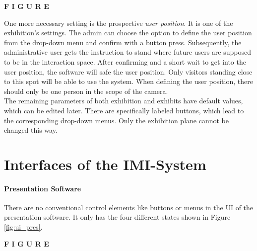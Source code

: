 \textbf{F I G U R E}

One more necessary setting is the prospective \textit{user position}. It is one of the exhibition's settings. The admin can choose the option to define the user position from the drop-down menu and confirm with a button press. Subsequently, the administrative user gets the instruction to stand where future users are supposed to be in the interaction space. After confirming and a short wait to get into the user position, the software will safe the user position. Only visitors standing close to this spot will be able to use the system. When defining the user position, there should only be one person in the scope of the camera.
\\
The remaining parameters of both exhibition and exhibits have default values, which can be edited later. There are specifically labeled buttons, which lead to the corresponding drop-down menus. Only the exhibition plane cannot be changed this way.


\section{Interfaces of the \ac{IMI}-System} 

\paragraph{Presentation Software} There are no conventional control elements like buttons or menus in the \ac{UI} of the presentation software. It only has the four different states shown in Figure \ref{fig:ui_pres}.

\textbf{F I G U R E}

